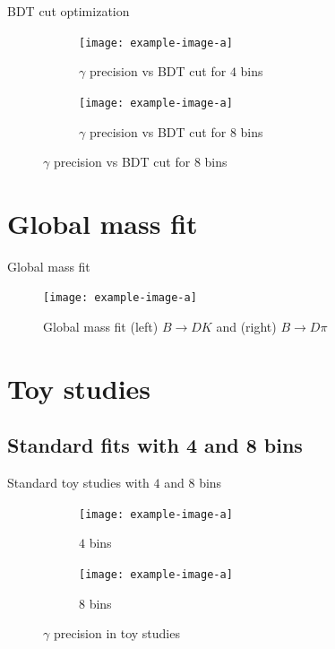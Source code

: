 \documentclass{beamer}
\begin{document}
\begin{frame}{BDT cut optimization}
  \begin{figure}
    \centering
    \vspace{-0.2cm}
    \begin{subfigure}{0.5\textwidth}
      \texttt{[image: example-image-a]}
      \caption{$\gamma$ precision vs BDT cut for $4$ bins}
    \end{subfigure}%
    \begin{subfigure}{0.5\textwidth}
      \texttt{[image: example-image-a]}
      \caption{$\gamma$ precision vs BDT cut for $8$ bins}
    \end{subfigure}
  \end{figure}
\end{frame}

\section{Global mass fit}
\begin{frame}{Global mass fit}
  \begin{figure}
    \centering
    \texttt{[image: example-image-a]}
    \caption{Global mass fit (left) $B\to DK$ and (right) $B\to D\pi$}
  \end{figure}
\end{frame}

\section{Toy studies}
\subsection{Standard fits with 4 and 8 bins}
\begin{frame}{Standard toy studies with $4$ and $8$ bins}
  \begin{figure}
    \centering
    \vspace{-0.2cm}
    \begin{subfigure}{0.5\textwidth}
      \texttt{[image: example-image-a]}
      \caption{$4$ bins}
    \end{subfigure}%
    \begin{subfigure}{0.5\textwidth}
      \texttt{[image: example-image-a]}
      \caption{$8$ bins}
    \end{subfigure}
    \caption{$\gamma$ precision in toy studies}
  \end{figure}
\end{frame}
\end{document}
